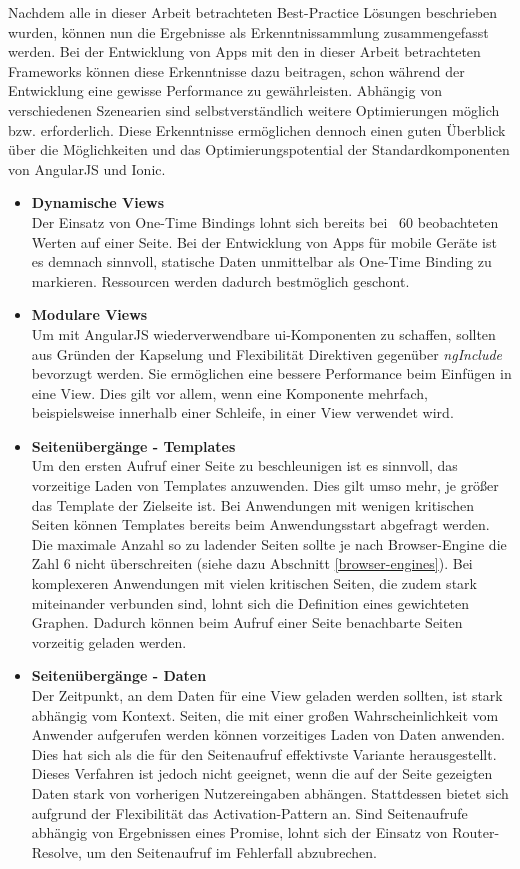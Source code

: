 Nachdem alle in dieser Arbeit betrachteten Best-Practice Lösungen beschrieben wurden, können nun die Ergebnisse als Erkenntnissammlung zusammengefasst werden. Bei der Entwicklung von Apps mit den in dieser Arbeit betrachteten Frameworks können diese Erkenntnisse dazu beitragen, schon während der Entwicklung eine gewisse Performance zu gewährleisten. Abhängig von verschiedenen Szenearien sind selbstverständlich weitere Optimierungen möglich bzw. erforderlich. Diese Erkenntnisse ermöglichen dennoch einen guten Überblick über die Möglichkeiten und das Optimierungspotential der Standardkomponenten von AngularJS und Ionic. 

\begin{itemize}
	\item \textbf{Dynamische Views}\\
	Der Einsatz von One-Time Bindings lohnt sich bereits bei ~60 beobachteten Werten auf einer Seite. Bei der Entwicklung von Apps für mobile Geräte ist es demnach sinnvoll, statische Daten unmittelbar als One-Time Binding zu markieren. Ressourcen werden dadurch bestmöglich geschont.
	
	\item \textbf{Modulare Views}\\
	Um mit AngularJS wiederverwendbare \gls{ui}-Komponenten zu schaffen, sollten aus Gründen der Kapselung und Flexibilität Direktiven gegenüber \emph{ngInclude} bevorzugt werden. Sie ermöglichen eine bessere Performance beim Einfügen in eine View. Dies gilt vor allem, wenn eine Komponente mehrfach, beispielsweise innerhalb einer Schleife, in einer View verwendet wird. 
	
	\item \textbf{Seitenübergänge - Templates}\\
	Um den ersten Aufruf einer Seite zu beschleunigen ist es sinnvoll, das vorzeitige Laden von \glspl{Template} anzuwenden. Dies gilt umso mehr, je größer das Template der Zielseite ist. Bei Anwendungen mit wenigen kritischen Seiten können Templates bereits beim Anwendungsstart abgefragt werden. Die maximale Anzahl so zu ladender Seiten sollte je nach Browser-Engine die Zahl 6 nicht überschreiten (siehe dazu Abschnitt \ref{browser-engines}). Bei komplexeren Anwendungen mit vielen kritischen Seiten, die zudem stark miteinander verbunden sind, lohnt sich die Definition eines gewichteten Graphen. Dadurch können beim Aufruf einer Seite benachbarte Seiten vorzeitig geladen werden.
	
	\item \textbf{Seitenübergänge - Daten}\\
	Der Zeitpunkt, an dem Daten für eine View geladen werden sollten, ist stark abhängig vom Kontext. Seiten, die mit einer großen Wahrscheinlichkeit vom Anwender aufgerufen werden können vorzeitiges Laden von Daten anwenden. Dies hat sich als die für den Seitenaufruf effektivste Variante herausgestellt. Dieses Verfahren ist jedoch nicht geeignet, wenn die auf der Seite gezeigten Daten stark von vorherigen Nutzereingaben abhängen. Stattdessen bietet sich aufgrund der Flexibilität das Activation-Pattern an. Sind Seitenaufrufe abhängig von Ergebnissen eines Promise, lohnt sich der Einsatz von Router-Resolve, um den Seitenaufruf im Fehlerfall abzubrechen. 
	

\end{itemize}
